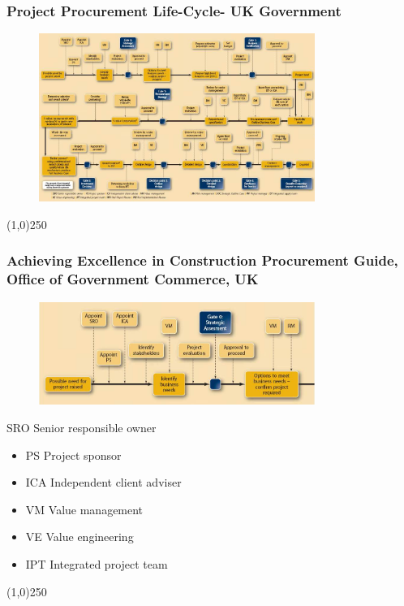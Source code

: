 \begin{frame}
\frametitle{Project Procurement Life-Cycle- UK Government}
 \begin{figure}
 	\centering
 		\includegraphics[width = 9cm]{images/life1.jpg}
 	\label{fig:UKlife1}
 \end{figure}
\end{frame}
\begin{center}\line(1,0){250}\end{center}



\begin{frame}
\frametitle{Achieving Excellence in Construction Procurement Guide, Office of Government Commerce, UK}
 \begin{figure}
 	\centering
 		\includegraphics[width = 9cm]{images/life2.jpg}
 	\label{fig:UKlife2}
 \end{figure}SRO Senior responsible owner 
\begin{itemize}
	\item PS Project sponsor 
	\item ICA Independent client adviser 
	\item VM Value management
	\item VE Value engineering 
	\item IPT Integrated project team
\end{itemize}
\end{frame}
\begin{center}\line(1,0){250}\end{center}



